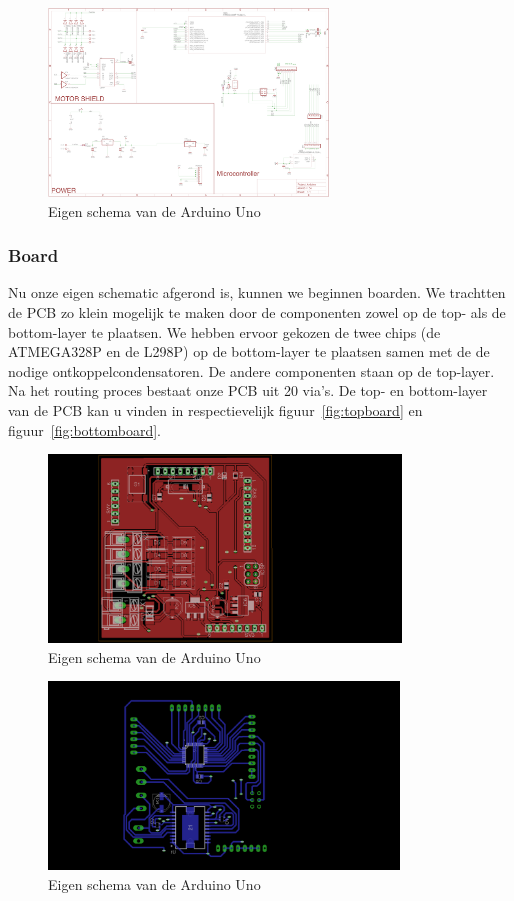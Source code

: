 \begin{figure}[H]
	\centering
	\includegraphics[height=5cm]{eigenschematic.png}
	\caption{Eigen schema van de Arduino Uno\label{fig:eigensch}}
\end{figure}

\subsubsection{Board}
Nu onze eigen schematic afgerond is, kunnen we beginnen boarden. We trachtten de PCB zo klein mogelijk te maken door de componenten zowel op de top- als de bottom-layer te plaatsen. We hebben ervoor gekozen de twee chips (de ATMEGA328P en de L298P) op de bottom-layer te plaatsen samen met de de nodige ontkoppelcondensatoren. De andere componenten staan op de top-layer. Na het routing proces bestaat onze PCB uit 20 via's. De top- en bottom-layer van de PCB kan u vinden in respectievelijk figuur~\vref{fig:topboard} en figuur~\vref{fig:bottomboard}.

\begin{figure}[H]
	\centering
	\includegraphics[height=5cm]{topboard.png}
	\caption{Eigen schema van de Arduino Uno\label{fig:topboard}}
\end{figure}

\begin{figure}[H]
	\centering
	\includegraphics[height=5cm]{bottomboard.png}
	\caption{Eigen schema van de Arduino Uno\label{fig:bottomboard}}
\end{figure}


